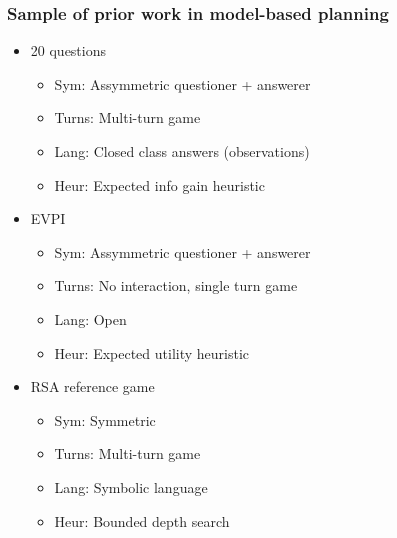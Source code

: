 \documentclass{beamer}
\begin{document}
\begin{frame}
\frametitle{Sample of prior work in model-based planning}
\begin{itemize}
\item 20 questions \citep{yu,padmakumar}
    \begin{itemize}
    \item Sym: Assymmetric questioner + answerer
    \item Turns: Multi-turn game
    \item Lang: Closed class answers (observations)
    \item Heur: Expected info gain heuristic
    \end{itemize}
\item EVPI \citep{rao,rao2}
    \begin{itemize}
    \item Sym: Assymmetric questioner + answerer
    \item Turns: No interaction, single turn game
    \item Lang: Open
    \item Heur: Expected utility heuristic
    \end{itemize}
\item RSA reference game \citep{khani}
    \begin{itemize}
    \item Sym: Symmetric
    \item Turns: Multi-turn game
    \item Lang: Symbolic language
    \item Heur: Bounded depth search
    \end{itemize}
\end{itemize}
\end{frame}
\end{document}
